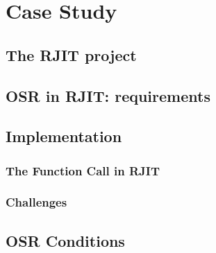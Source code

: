 
\chapter{Case Study} %

\label{Chapter5} %


\newcommand{\keyword}[1]{\textbf{#1}}
\newcommand{\tabhead}[1]{\textbf{#1}}
\newcommand{\code}[1]{\texttt{#1}}
\newcommand{\file}[1]{\texttt{\bfseries#1}}
\newcommand{\option}[1]{\texttt{\itshape#1}}


\section{The RJIT project}
\section{OSR in RJIT: requirements}
\section{Implementation}
\subsection{The Function Call in RJIT}
\subsection{Challenges}
\section{OSR Conditions}
